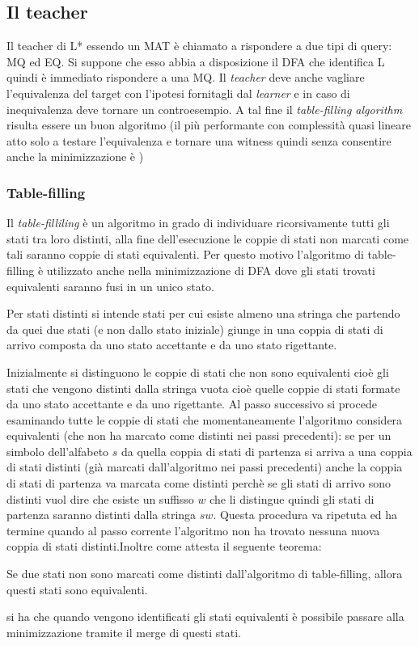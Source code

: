 \subsection{Il teacher} 
\label{sub:tea}Il teacher di L* essendo un \ac{MAT} è chiamato a rispondere a due tipi di query: \ac{MQ} ed \ac{EQ}. Si suppone che esso abbia a disposizione il DFA che identifica \ac{L} quindi è immediato rispondere a una \ac{MQ}. Il \textit{teacher} deve anche vagliare l'equivalenza del target con l'ipotesi fornitagli dal \textit{learner} e in caso di inequivalenza deve tornare un controesempio. A tal fine il \textit{table-filling algorithm} \cite{Nor09} risulta essere un buon algoritmo (il più performante con complessità quasi lineare atto solo a testare l'equivalenza e tornare una witness  quindi senza consentire anche la minimizzazione è \cite{Hop71} )
\subsubsection{Table-filling}Il \textit{table-filliling} \cite{Nor09} è un algoritmo in grado di individuare ricorsivamente tutti gli stati tra loro distinti, alla fine dell'esecuzione le coppie di stati non marcati come tali saranno coppie di stati equivalenti. Per questo motivo l'algoritmo di table-filling è utilizzato anche nella minimizzazione di DFA dove gli stati trovati equivalenti saranno fusi in un unico stato.

Per stati distinti si intende stati per cui esiste almeno una stringa che partendo da quei due stati (e non dallo stato iniziale) giunge in una coppia di stati di arrivo composta da uno stato accettante e da uno stato rigettante.

Inizialmente si distinguono le coppie di stati che non sono equivalenti cioè gli stati che vengono distinti dalla stringa vuota cioè quelle coppie di stati formate da uno stato accettante e da uno rigettante. Al passo successivo si procede esaminando tutte le coppie di stati che momentaneamente l'algoritmo considera equivalenti (che non ha marcato come distinti nei passi precedenti): se per un simbolo dell'alfabeto $s$ da quella coppia di stati di partenza si arriva a una coppia di stati distinti (già marcati dall'algoritmo nei passi precedenti) anche la coppia di stati di partenza va marcata come distinti perchè se gli stati di arrivo sono distinti vuol dire che esiste un suffisso $w$ che li distingue quindi gli stati di partenza saranno distinti dalla stringa $sw$. Questa procedura va ripetuta ed ha termine quando al passo corrente l'algoritmo non ha trovato nessuna nuova coppia di stati distinti.Inoltre come attesta il seguente teorema:
\begin{teorema*}
Se due stati non sono marcati come distinti dall'algoritmo di table-filling, allora questi stati sono equivalenti. \cite{Hop07}
\end{teorema*}
si ha che  quando vengono identificati gli stati equivalenti è possibile passare alla minimizzazione tramite il merge di questi stati.


